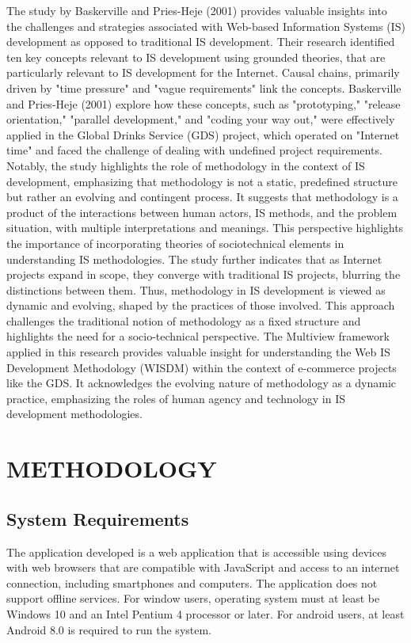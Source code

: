 \documentclass[journal]{./IEEE/IEEEtran}
\begin{document}
The study by Baskerville and Pries-Heje (2001) provides valuable insights into the challenges and strategies associated with Web-based Information Systems (IS) development as opposed to traditional IS development. Their research identified ten key concepts relevant to IS development using grounded theories, that are particularly relevant to IS development for the Internet. Causal chains, primarily driven by "time pressure" and "vague requirements" link the concepts. Baskerville and Pries-Heje (2001) explore how these concepts, such as "prototyping," "release orientation," "parallel development," and "coding your way out," were effectively applied in the Global Drinks Service (GDS) project, which operated on "Internet time" and faced the challenge of dealing with undefined project requirements. Notably, the study highlights the role of methodology in the context of IS development, emphasizing that methodology is not a static, predefined structure but rather an evolving and contingent process. It suggests that methodology is a product of the interactions between human actors, IS methods, and the problem situation, with multiple interpretations and meanings. This perspective highlights the importance of incorporating theories of sociotechnical elements in understanding IS methodologies. The study further indicates that as Internet projects expand in scope, they converge with traditional IS projects, blurring the distinctions between them. Thus, methodology in IS development is viewed as dynamic and evolving, shaped by the practices of those involved. This approach challenges the traditional notion of methodology as a fixed structure and highlights the need for a socio-technical perspective. The Multiview framework applied in this research provides valuable insight for understanding the Web IS Development Methodology (WISDM) within the context of e-commerce projects like the GDS. It acknowledges the evolving nature of methodology as a dynamic practice, emphasizing the roles of human agency and technology in IS development methodologies. 



\section{\textbf{METHODOLOGY}}

\subsection{\textbf{System Requirements}}
The application developed is a web application that is accessible using devices with web browsers that are compatible with JavaScript and access to an internet connection, including smartphones and computers. The application does not support offline services. For window users, operating system must at least be Windows 10 and an Intel Pentium 4 processor or later. For android users, at least Android 8.0 is required to run the system.  
\end{document}
